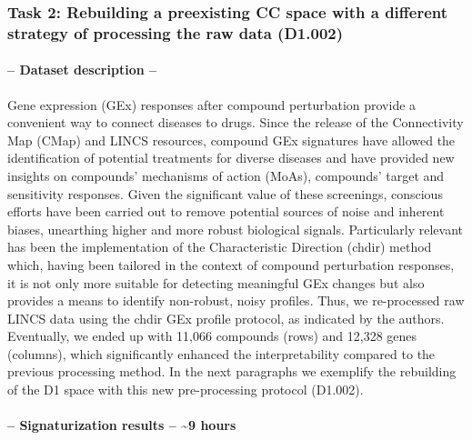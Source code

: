 


\subsubsection{Task 2: Rebuilding a preexisting CC space with a different strategy of processing the raw data (D1.002)}


\paragraph{-- Dataset description --} \leavevmode

Gene expression (GEx) responses after compound perturbation provide a convenient way to connect diseases to drugs. Since the release of the Connectivity Map (CMap) and LINCS resources, compound GEx signatures have allowed the identification of potential treatments for diverse diseases \cite{pauls_identification_2021, sawada_predicting_2018, chen_reversal_2017} and have provided new insights on compounds’ mechanisms of action (MoAs), compounds’ target and sensitivity responses. Given the significant value of these screenings, conscious efforts have been carried out to remove potential sources of noise and inherent biases, unearthing higher and more robust biological signals. Particularly relevant has been the implementation of the Characteristic Direction (chdir) method\cite{clark_characteristic_2014} which, having been tailored in the context of compound perturbation responses, it is not only more suitable for detecting meaningful GEx changes but also provides a means to identify non-robust, noisy profiles. Thus, we re-processed raw LINCS data using the chdir GEx profile protocol, as indicated by the authors. Eventually, we ended up with 11,066 compounds (rows) and 12,328 genes (columns), which significantly enhanced the interpretability compared to the previous processing method. In the next paragraphs we exemplify the rebuilding of the D1 space with this new pre-processing protocol (D1.002). 

\paragraph{-- Signaturization results -- \textasciitilde9 hours}  \leavevmode

